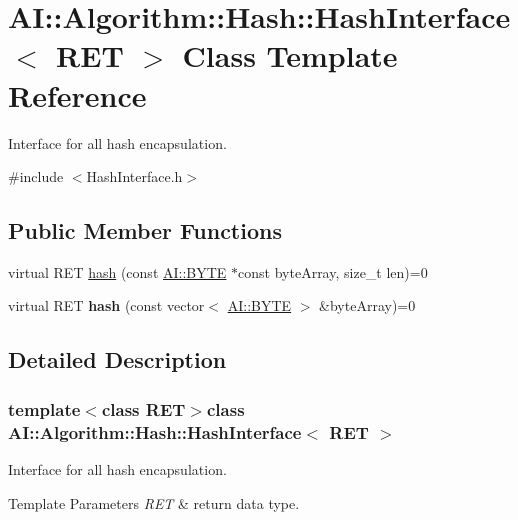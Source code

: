 \hypertarget{classAI_1_1Algorithm_1_1Hash_1_1HashInterface}{\section{A\+I\+:\+:Algorithm\+:\+:Hash\+:\+:Hash\+Interface$<$ R\+E\+T $>$ Class Template Reference}
\label{classAI_1_1Algorithm_1_1Hash_1_1HashInterface}
}


Interface for all hash encapsulation.  




{\ttfamily \#include $<$Hash\+Interface.\+h$>$}

\subsection*{Public Member Functions}
\begin{DoxyCompactItemize}
\item 
virtual R\+E\+T \hyperlink{classAI_1_1Algorithm_1_1Hash_1_1HashInterface_ae31d650fd044e3ef372cae18a422e0d9}{hash} (const \hyperlink{namespaceAI_a9d4bcda82fe0f9aac3c4861e24491581}{A\+I\+::\+B\+Y\+T\+E} $\ast$const byte\+Array, size\+\_\+t len)=0
\item 
\hypertarget{classAI_1_1Algorithm_1_1Hash_1_1HashInterface_a960c6305b583d12df2a067191c4a6f58}{virtual R\+E\+T {\bfseries hash} (const vector$<$ \hyperlink{namespaceAI_a9d4bcda82fe0f9aac3c4861e24491581}{A\+I\+::\+B\+Y\+T\+E} $>$ \&byte\+Array)=0}\label{classAI_1_1Algorithm_1_1Hash_1_1HashInterface_a960c6305b583d12df2a067191c4a6f58}

\end{DoxyCompactItemize}


\subsection{Detailed Description}
\subsubsection*{template$<$class R\+E\+T$>$class A\+I\+::\+Algorithm\+::\+Hash\+::\+Hash\+Interface$<$ R\+E\+T $>$}

Interface for all hash encapsulation. 


\begin{DoxyTemplParams}{Template Parameters}
{\em R\+E\+T} & return data type. \\
\hline
\end{DoxyTemplParams}


